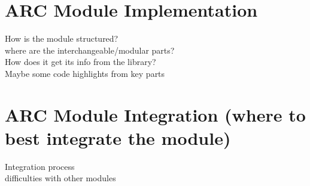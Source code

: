\section{ARC Module Implementation}
How is the module structured? \\
where are the interchangeable/modular parts? \\
How does it get its info from the library? \\
Maybe some code highlights from key parts

\section{ARC Module Integration (where to best integrate the module)}
Integration process \\
difficulties with other modules

